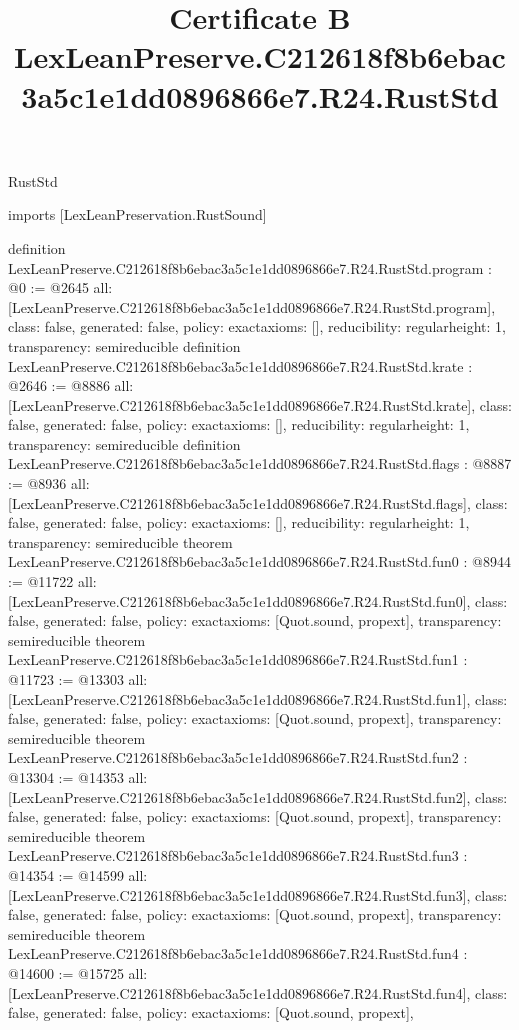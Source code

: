 \begin{lexlean}{RustStd}
\title{Certificate B LexLeanPreserve.C212618f8b6ebac3a5c1e1dd0896866e7.R24.RustStd}
\begin{coremodule}
imports [LexLeanPreservation.RustSound]

definition LexLeanPreserve.C212618f8b6ebac3a5c1e1dd0896866e7.R24.RustStd.program : @0 := @2645 {
  all: [LexLeanPreserve.C212618f8b6ebac3a5c1e1dd0896866e7.R24.RustStd.program],
  class: false,
  generated: false,
  policy: exact{axioms: []},
  reducibility: regular{height: 1},
  transparency: semireducible
}
definition LexLeanPreserve.C212618f8b6ebac3a5c1e1dd0896866e7.R24.RustStd.krate : @2646 := @8886 {
  all: [LexLeanPreserve.C212618f8b6ebac3a5c1e1dd0896866e7.R24.RustStd.krate],
  class: false,
  generated: false,
  policy: exact{axioms: []},
  reducibility: regular{height: 1},
  transparency: semireducible
}
definition LexLeanPreserve.C212618f8b6ebac3a5c1e1dd0896866e7.R24.RustStd.flags : @8887 := @8936 {
  all: [LexLeanPreserve.C212618f8b6ebac3a5c1e1dd0896866e7.R24.RustStd.flags],
  class: false,
  generated: false,
  policy: exact{axioms: []},
  reducibility: regular{height: 1},
  transparency: semireducible
}
theorem LexLeanPreserve.C212618f8b6ebac3a5c1e1dd0896866e7.R24.RustStd.fun0 : @8944 := @11722 {
  all: [LexLeanPreserve.C212618f8b6ebac3a5c1e1dd0896866e7.R24.RustStd.fun0],
  class: false,
  generated: false,
  policy: exact{axioms: [Quot.sound, propext]},
  transparency: semireducible
}
theorem LexLeanPreserve.C212618f8b6ebac3a5c1e1dd0896866e7.R24.RustStd.fun1 : @11723 := @13303 {
  all: [LexLeanPreserve.C212618f8b6ebac3a5c1e1dd0896866e7.R24.RustStd.fun1],
  class: false,
  generated: false,
  policy: exact{axioms: [Quot.sound, propext]},
  transparency: semireducible
}
theorem LexLeanPreserve.C212618f8b6ebac3a5c1e1dd0896866e7.R24.RustStd.fun2 : @13304 := @14353 {
  all: [LexLeanPreserve.C212618f8b6ebac3a5c1e1dd0896866e7.R24.RustStd.fun2],
  class: false,
  generated: false,
  policy: exact{axioms: [Quot.sound, propext]},
  transparency: semireducible
}
theorem LexLeanPreserve.C212618f8b6ebac3a5c1e1dd0896866e7.R24.RustStd.fun3 : @14354 := @14599 {
  all: [LexLeanPreserve.C212618f8b6ebac3a5c1e1dd0896866e7.R24.RustStd.fun3],
  class: false,
  generated: false,
  policy: exact{axioms: [Quot.sound, propext]},
  transparency: semireducible
}
theorem LexLeanPreserve.C212618f8b6ebac3a5c1e1dd0896866e7.R24.RustStd.fun4 : @14600 := @15725 {
  all: [LexLeanPreserve.C212618f8b6ebac3a5c1e1dd0896866e7.R24.RustStd.fun4],
  class: false,
  generated: false,
  policy: exact{axioms: [Quot.sound, propext]},
}
\end{coremodule}
\end{lexlean}
